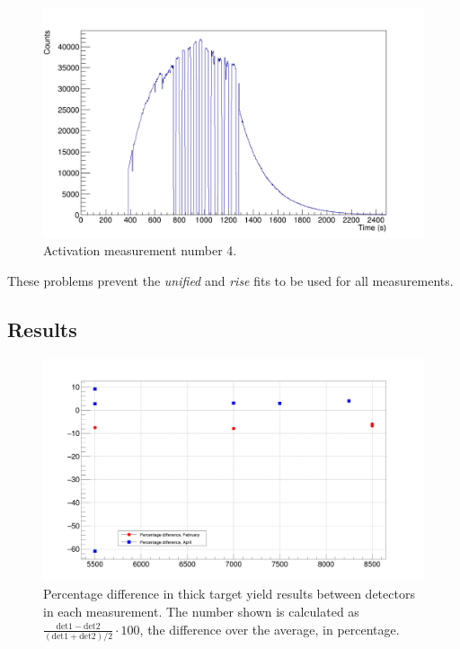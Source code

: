 \documentclass[a4paper,12pt]{report}
\begin{document}
\begin{figure}[H]
	\centering
	\includegraphics[width=\textwidth]{activation_4_time.png}
	\caption{Activation measurement number 4.}
	\label{activation_4_time}
\end{figure}

These problems prevent the \textit{unified} and \textit{rise} fits to be used for all measurements.
\\

\subsection{Results}

\begin{figure}[H]
	\centering
	\includegraphics[width=\textwidth]{decay_errors_rel_per.png}
	\caption{Percentage difference in thick target yield results between detectors in each measurement.
	The number shown is calculated as $\frac{\text{det}1-\text{det}2}{\left(\text{det}1+\text{det}2\right)/2}\cdot 100$, the difference over the average, in percentage.}
	\label{decay_errors_rel_per}
\end{figure}
\end{document}
